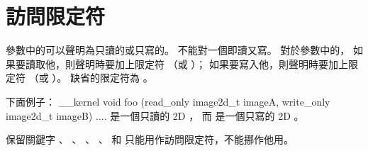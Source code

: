 \section{訪問限定符}

參數中的可以聲明為只讀的或只寫的。
不能對一個即讀又寫。
對於參數中的，
如果要讀取他，則聲明時要加上限定符  （或 ）；
如果要寫入他，則聲明時要加上限定符  （或 ）。
缺省的限定符為 。

下面例子：
\startclc
__kernel void foo (read_only image2d_t imageA,
		   write_only image2d_t imageB)
{
	....
}
\stopclc
{} 是一個只讀的 2D ，
而  是一個只寫的 2D 。

保留關鍵字
 、 、 、
 、  和 
 只能用作訪問限定符，不能挪作他用。


